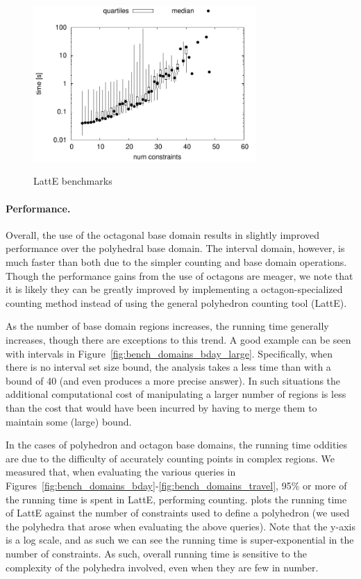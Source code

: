 \begin{figure}[t!]
\scriptsize
\centering
\includegraphics[width=8.5cm]{figures/plot_latte.pdf} \\
\caption{LattE benchmarks}
\label{fig:bench_latte}
\end{figure}

\paragraph*{Performance.}
Overall, the use of the octagonal base domain results in slightly
improved performance over the polyhedral base domain. The interval
domain, however, is much faster than both due to the simpler counting
and base domain operations.  Though the performance gains from the use
of octagons are meager, we note that it is likely they can be greatly
improved by implementing a octagon-specialized counting method instead
of using the general polyhedron counting tool (LattE).

As the number of base domain regions increases, the running time
generally increases, though there are exceptions to this trend.  A
good example can be seen with intervals in
Figure~\ref{fig:bench_domains_bday_large}. Specifically, when there is
no interval set size bound, the analysis takes a less time than with a
bound of 40 (and even produces a more precise answer). In such
situations the additional computational cost of manipulating a larger
number of regions is less than the cost that would have been incurred
by having to merge them to maintain some (large) bound.

In the cases of polyhedron and octagon base domains, the running time
oddities are due to the difficulty of accurately counting points in
complex regions.  We measured that, when evaluating the various
queries in
Figures~\ref{fig:bench_domains_bday}-\ref{fig:bench_domains_travel},
95\% or more of the running time is spent in LattE, performing
counting.   plots the running time of LattE
against the number of constraints used to define a polyhedron (we used
the polyhedra that arose when evaluating the above queries).  Note
that the y-axis is a log scale, and as such we can see the running
time is super-exponential in the number of constraints.  As such,
overall running time is sensitive to the complexity of the polyhedra
involved, even when they are few in number.  

